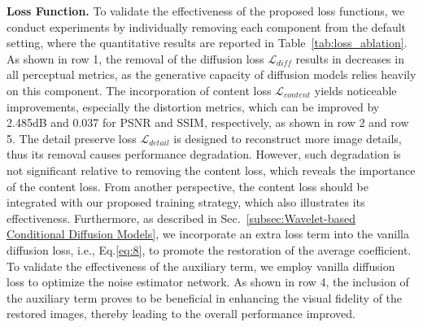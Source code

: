 \textbf{Loss Function.}
To validate the effectiveness of the proposed loss functions, we conduct experiments by individually removing each component from the default setting, where the quantitative results are reported in Table~\ref{tab:loss_ablation}. As shown in row 1, the removal of the diffusion loss $\mathcal{L}_{diff}$ results in decreases in all perceptual metrics, as the generative capacity of diffusion models relies heavily on this component. The incorporation of content loss $\mathcal{L}_{content}$ yields noticeable improvements, especially the distortion metrics, which can be improved by 2.485dB and 0.037 for PSNR and SSIM, respectively, as shown in row 2 and row 5. The detail preserve loss $\mathcal{L}_{detail}$ is designed to reconstruct more image details, thus its removal causes performance degradation. However, such degradation is not significant relative to removing the content loss, which reveals the importance of the content loss. From another perspective, the content loss should be integrated with our proposed training strategy, which also illustrates its effectiveness. Furthermore, as described in Sec.~\ref{subsec:Wavelet-based Conditional Diffusion Models}, we incorporate an extra loss term into the vanilla diffusion loss, i.e., Eq.\ref{eq:8}, to promote the restoration of the average coefficient. To validate the effectiveness of the auxiliary term, we employ vanilla diffusion loss to optimize the noise estimator network. As shown in row 4, the inclusion of the auxiliary term proves to be beneficial in enhancing the visual fidelity of the restored images, thereby leading to the overall performance improved.
\begin{table}[!t]
	\centering
	\caption{Ablation studies of the training strategy of our wavelet-based conditional diffusion model. The results using default settings are \underline{underlined}.}
	\label{tab:training_ablation}
\end{table}
